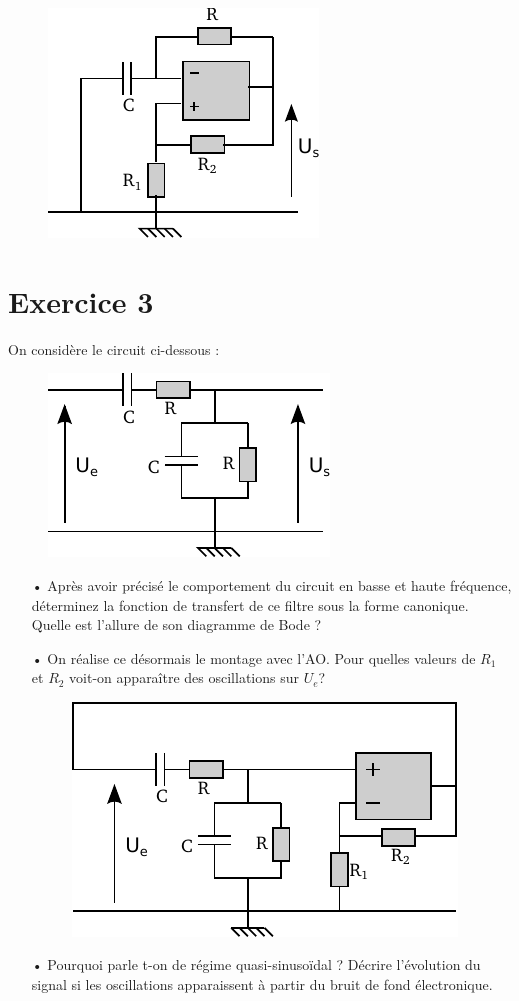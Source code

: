 \documentclass{report}
\begin{document}
\begin{figure}[!h]
\centering
\includegraphics[width=0.5\linewidth]{circuit_3.pdf}
\end{figure}

\newpage

\section*{Exercice 3}

On considère le circuit ci-dessous :

\begin{figure}[!h]
\centering
\includegraphics[width=0.5\linewidth]{circuit_1.pdf}
\end{figure}

\begin{itemize}
	\item[•] Après avoir précisé le comportement du circuit en basse et haute fréquence, déterminez la fonction de transfert de ce filtre sous la forme canonique. Quelle est l'allure de son diagramme de Bode ?
	\item[•] On réalise ce désormais le montage avec l'AO. Pour quelles valeurs de $R_1$ et $R_2$ voit-on apparaître des oscillations sur $U_{e}$?
\begin{figure}[!h]
\centering
\includegraphics[width=0.6\linewidth]{circuit_4.pdf}
\end{figure}

	\item[•] Pourquoi parle t-on de régime quasi-sinusoïdal ? Décrire l'évolution du signal si les oscillations apparaissent à partir du bruit de fond électronique.
\end{itemize}
\end{document}
